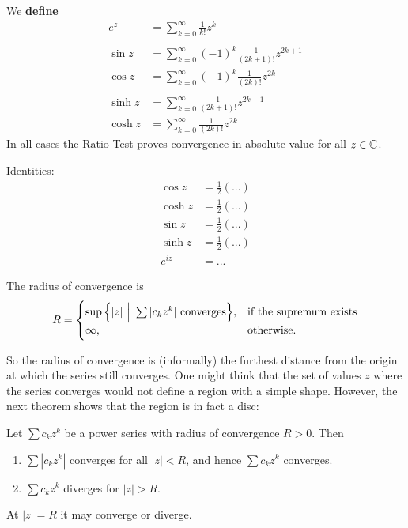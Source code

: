 \begin{example*}
  We {\bf define}
  \begin{align*}
    e^z     &= \sum_{k=0}^\infty \frac{1}{k!}z^k\\
    \\
              \sin z  &= \sum_{k=0}^\infty (-1)^k\frac{1}{(2k+1)!}z^{2k + 1}\\
    \cos z  &= \sum_{k=0}^\infty (-1)^k\frac{1}{(2k)!}z^{2k}\\
    \\
    \sinh z &= \sum_{k=0}^\infty \frac{1}{(2k+1)!}z^{2k + 1}\\
    \cosh z &= \sum_{k=0}^\infty \frac{1}{(2k)!}z^{2k}
  \end{align*}
  In all cases the Ratio Test proves convergence in absolute value for all $z \in \mathbb{C}$.

  Identities:
  \begin{align*}
    \cos z  &= \frac{1}{2}(...)\\
    \cosh z &= \frac{1}{2}(...)\\
    \sin z  &= \frac{1}{2}(...)\\
    \sinh z &= \frac{1}{2}(...)\\
    e^{iz} &= ...
  \end{align*}
\end{example*}

\begin{definition*}
  The radius of convergence is
  \begin{align*}
    R =
    \begin{cases}
      \sup \Big\{|z| ~\Big|~ \sum|c_kz^k| ~\textup{converges}\Big\}, &\textup{if the supremum exists}\\
      \infty, &\textup{otherwise}.
    \end{cases}
  \end{align*}
\end{definition*}

\begin{remark*}
  So the radius of convergence is (informally) the furthest distance from the origin at which the
  series still converges. One might think that the set of values $z$ where the series converges
  would not define a region with a simple shape. However, the next theorem shows that the region is
  in fact a disc:
\end{remark*}

\begin{theorem*}
  Let $\sum c_kz^k$ be a power series with radius of convergence $R > 0$. Then
  \begin{enumerate}
  \item $\sum |c_kz^k|$ converges for all $|z| < R$, and hence $\sum c_kz^k$ converges.
  \item $\sum c_kz^k$ diverges for $|z| > R$.
  \end{enumerate}
  At $|z| = R$ it may converge or diverge.
\end{theorem*}

